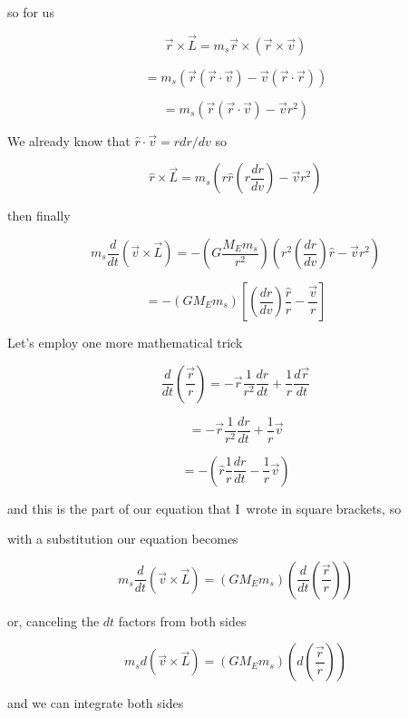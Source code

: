 so for us 

$$\overrightarrow{r}\times \overrightarrow{L}=m_{s}\overrightarrow{r}\times\left( \overrightarrow{r}\times \overrightarrow{v}\right) $$

$$=m_{s}\left( \overrightarrow{r}\left( \overrightarrow{r}\cdot \overrightarrow{v}\right) -\overrightarrow{v}\left( \overrightarrow{r}\cdot \overrightarrow{r}\right) \right) $$

$$=m_{s}\left( \overrightarrow{r}\left( \overrightarrow{r}\cdot \overrightarrow{v}\right) -\overrightarrow{v}r^{2}\right) $$


We already know that $\hat{r}\cdot \overrightarrow{v}=rdr/dv$ so 

$$\hat{r}\times \overrightarrow{L}=m_{s}\left( r\hat{r}\left( r\frac{dr}{dv}\right) -\overrightarrow{v}r^{2}\right) $$

then finally 

$$ m_{s}\frac{d}{dt}\left( \overrightarrow{v}\times \overrightarrow{L}\right)=-\left( G\frac{M_{E}m_{s}}{r^{2}}\right) \left( r^{2}\left( \frac{dr}{dv}\right) \hat{r}-\overrightarrow{v}r^{2}\right) 
$$

$$=-\left( GM_{E}m_{s}\right) \left[ \left( \frac{dr}{dv}\right) \frac{\hat{r}}{r}-\frac{\overrightarrow{v}}{r}\right] $$


Let's employ one more mathematical trick%

$$\frac{d}{dt}\left( \frac{\overrightarrow{r}}{r}\right) =-\overrightarrow{r} \frac{1}{r^{2}}\frac{dr}{dt}+\frac{1}{r}\frac{d\overrightarrow{r}}{dt}
$$

$$=-\overrightarrow{r}\frac{1}{r^{2}}\frac{dr}{dt}+\frac{1}{r}\overrightarrow{v}
$$

$$=-\left( \hat{r}\frac{1}{r}\frac{dr}{dt}-\frac{1}{r}\overrightarrow{v}\right)$$

and this is the part of our equation that I\ wrote in square brackets, so

with a substitution our equation becomes%

$$m_{s}\frac{d}{dt}\left( \overrightarrow{v}\times \overrightarrow{L}\right)=\left( GM_{E}m_{s}\right) \left( \frac{d}{dt}\left( \frac{\overrightarrow{r}}{r}\right) \right) $$

or, canceling the $dt$ factors from both sides%

$$m_{s}d\left( \overrightarrow{v}\times \overrightarrow{L}\right) =\left(GM_{E}m_{s}\right) \left( d\left( \frac{\overrightarrow{r}}{r}\right)\right)
$$

and we can integrate both sides%

